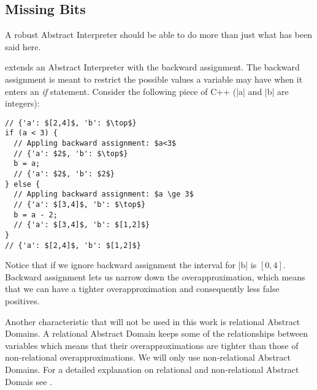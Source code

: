 \subsection{Missing Bits}\label{missing-bits}

A robust Abstract Interpreter should be able to do more than just what
has been said here.

\textcite{mine_weakly_2004} extends an Abstract Interpreter with the
backward assignment. The backward assignment is meant to restrict the
possible values a variable may have when it enters an \emph{if}
statement. Consider the following piece of C++ (\pycode|a| and
\pycode|b| are integers):

\begin{verbatim}
// {'a': $[2,4]$, 'b': $\top$}
if (a < 3) {
  // Appling backward assignment: $a<3$
  // {'a': $2$, 'b': $\top$}
  b = a;
  // {'a': $2$, 'b': $2$}
} else {
  // Appling backward assignment: $a \ge 3$
  // {'a': $[3,4]$, 'b': $\top$}
  b = a - 2;
  // {'a': $[3,4]$, 'b': $[1,2]$}
}
// {'a': $[2,4]$, 'b': $[1,2]$}
\end{verbatim}

Notice that if we ignore backward assignment the interval for \pycode|b| is \([0,4]\).
Backward assignment lets us narrow down the overapproximation, which means that we can
have a tighter overapproximation and consequently less false positives.

Another characteristic that will not be used in this work is relational Abstract Domains.
A relational Abstract Domain keeps some of the relationships between variables which means
that their overapproximations are tighter than those of non-relational overapproximations.
We will only use non-relational Abstract Domains. For a detailed explanation on relational
and non-relational Abstract Domais see \textcite{mine_weakly_2004}.
